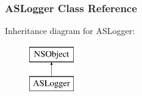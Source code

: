 \hypertarget{interface_a_s_logger}{
\subsubsection{ASLogger Class Reference}
\label{interface_a_s_logger}
}
Inheritance diagram for ASLogger:\begin{figure}[h]
\begin{center}
\leavevmode
\includegraphics[height=2.000000cm]{interface_a_s_logger}
\end{center}
\end{figure}
